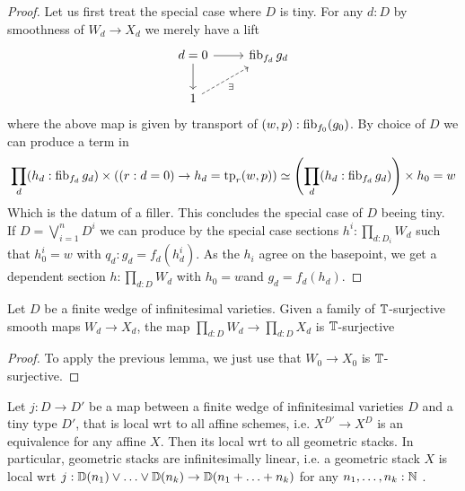 \begin{proof}
	Let us first treat the special case where $D$ is tiny.
	For any $d : D$ by smoothness of $W_d \to X_d$ we merely have a lift 
	\[\begin{tikzcd}
		{d=0} & {\fib_{f_d} g_d} \\
		1
		\arrow[from=1-1, to=1-2]
		\arrow[from=1-1, to=2-1]
		\arrow["\exists"', dashed, from=2-1, to=1-2]
	\end{tikzcd}\]
	where the above map is given by transport of $(w , p) : \operatorname{fib}_{f_0}(g_0)$.
	By choice of $D$ we can produce a term in 
	\[
	\prod_d (h_d : \operatorname{fib}_{f_d} g_d) \times ((r : d = 0) \to  h_d = \mathrm{tp}_r(w,p)) \simeq \left(\prod_d (h_d : \operatorname{fib}_{f_d} g_d) \right) \times h_0 = w 
	\]
	Which is the datum of a filler.	This concludes the special case of $D$ beeing tiny. \\
	If $D = \bigvee_{i=1}^n D^i$ we can produce by the special case sections $h^i : \prod_{d: D_i} W_d$ such that $h^i_0 = w$ with $q_d : g_d = f_d(h^i_d)$. As the $h_i$ agree on the basepoint, we get a dependent section $h : \prod_{d: D} W_d$ with $h_0 = w$and $g_d = f_d (h_d)$.
\end{proof}
\begin{lemma}
	Let $D$ be a finite wedge of infinitesimal varieties. Given a family of $\mathbb{T}$-surjective smooth maps $W_d \to X_d$, the map $\prod_{d: D} W_d \to \prod_{d: D} X_d$ is $\mathbb{T}$-surjective
\end{lemma}
\begin{proof}
	To apply the previous lemma, we just use that $W_0 \to X_0$ is $\mathbb{T}$-surjective.
\end{proof}
\begin{prop}
	Let $j : D \to D'$ be a map between a finite wedge of infinitesimal varieties $D$ and a tiny type $D'$, that is local wrt to all affine schemes, i.e. $X ^ {D'} \to X ^D$ is an equivalence for any affine $X$. Then its local wrt to all geometric stacks.
	In particular, geometric stacks are infinitesimally linear, i.e. a geometric stack $X$ is local wrt $j : \mathbb{D}(n_1) \lor \hdots \lor \mathbb{D}(n_k) \to \mathbb{D}(n_1+ \hdots + n_k)$ for any $n_1,\hdots,n_k : \mathbb{N}$ .
\end{prop}
